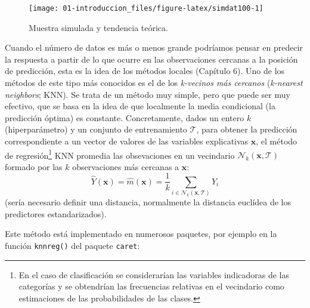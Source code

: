 \documentclass[]{book}
\theoremstyle{break}
\theoremstyle{definition}
\theoremstyle{definition}
\theoremstyle{definition}
\theoremstyle{remark}
\begin{document}
\begin{figure}[!htb]

{\centering \texttt{[image: 01-introduccion\_files/figure-latex/simdat100-1]} 

}

\caption{Muestra simulada y tendencia teórica.}\label{fig:simdat100}
\end{figure}

Cuando el número de datos es más o menos grande podríamos pensar en
predecir la respuesta a partir de lo que ocurre en las observaciones
cercanas a la posición de predicción, esta es la idea de los métodos
locales (Capítulo 6). Uno de los métodos de este tipo más conocidos es
el de los \emph{k-vecinos más cercanos} (\emph{k-nearest neighbors};
KNN). Se trata de un método muy simple, pero que puede ser muy efectivo,
que se basa en la idea de que localmente la media condicional (la
predicción óptima) es constante. Concretamente, dados un entero \(k\)
(hiperparámetro) y un conjunto de entrenamiento \(\mathcal{T}\), para
obtener la predicción correspondiente a un vector de valores de las
variables explicativas \(\mathbf{x}\), el método de regresión\footnote{En
  el caso de clasificación se considerarían las variables indicadoras de
  las categorías y se obtendrían las frecuencias relativas en el
  vecindario como estimaciones de las probabilidades de las clases.} KNN
promedia las obsevaciones en un vecindario
\(\mathcal{N}_k(\mathbf{x}, \mathcal{T})\) formado por las \(k\)
observaciones más cercanas a \(\mathbf{x}\):
\[\hat{Y}(\mathbf{x}) = \hat{m}(\mathbf{x}) = \frac{1}{k} \sum_{i \in \mathcal{N}_k(\mathbf{x}, \mathcal{T})} Y_i\]
(sería necesario definir una distancia, normalmente la distancia
euclídea de los predictores estandarizados).

Este método está implementado en numerosos paquetes, por ejemplo en la
función \texttt{knnreg()} del paquete \texttt{caret}:
\end{document}
